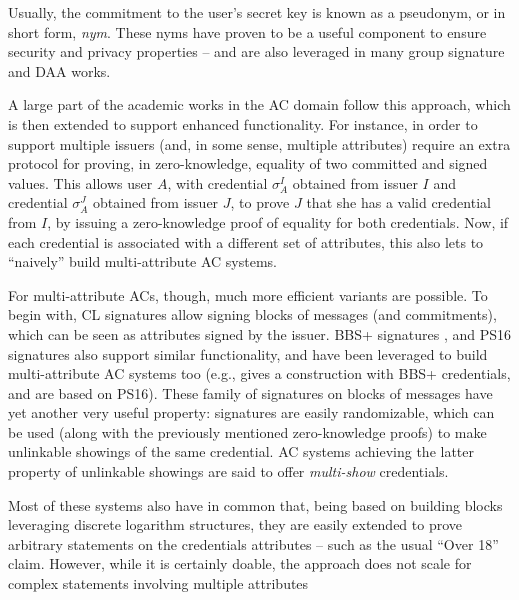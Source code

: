 Usually, the commitment to the user's secret key is known as a pseudonym, or
in short form, \emph{nym}. These nyms have proven to be a useful component to
ensure security and privacy properties -- and are also leveraged in many group
signature and DAA works. 

A large part of the academic works in the AC domain follow this approach, which
is then extended to support enhanced functionality. For instance, in order to
support multiple issuers (and, in some sense, multiple attributes)
\cite{cl01,cl02,cl04}  require an
extra protocol for proving, in zero-knowledge, equality of two committed and signed values.
This allows user $A$, with credential $\sigma_A^I$ obtained from issuer $I$ and
credential $\sigma_A^J$ obtained from issuer $J$, to prove $J$ that she has a
valid credential from $I$, by issuing a zero-knowledge proof of equality for
both credentials. Now, if each credential is associated with a different set of
attributes, this also lets to ``naively'' build multi-attribute AC systems.

For multi-attribute ACs, though, much more efficient variants are possible. To
begin with, CL signatures allow signing blocks of messages (and commitments),
which can be seen as attributes signed by the issuer. BBS+ signatures
\cite{am06,cdl16b}, and PS16 signatures \cite{ps16} also support similar
functionality, and have been leveraged to build multi-attribute AC systems
too (e.g., \cite{cks10} gives a construction with BBS+ credentials, and
\cite{sms+19,halp20} are based on PS16). These family of signatures on blocks
of messages have yet another very useful property: signatures are easily
randomizable, which can be used (along with the previously mentioned
zero-knowledge proofs) to make unlinkable showings of the same credential.
AC systems achieving the latter property of unlinkable showings are said
to offer \emph{multi-show} credentials.

Most of these systems also have in common that, being based on building blocks
leveraging discrete logarithm structures, they are easily extended to prove
arbitrary statements on the credentials attributes -- such as the usual ``Over
18'' claim. However, while it is certainly doable, the approach does not scale
for complex statements involving multiple attributes 

